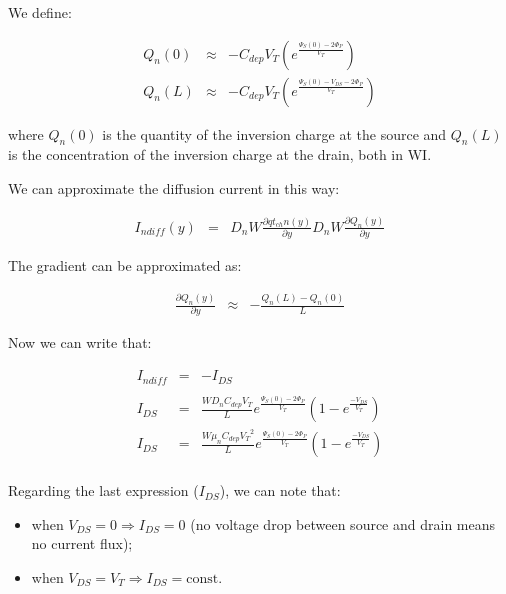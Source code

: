 \documentclass[a4paper, 12pt, twoside, openright]{report}
\begin{document}
We define:

	\begin{eqnarray*}
	Q_n(0)&\approx&-C_{dep} V_T
	             \left(e^{\displaystyle \frac{\Psi_S(0)-2\Phi_P}{V_T}}
	               \right)\\[2ex]
	Q_n(L)&\approx&-C_{dep} V_T
	             \left(e^{\displaystyle \frac{\Psi_S(0)- {V_{DS}}-2\Phi_P}{V_T}}
	              \right)
	\end{eqnarray*}

where $Q_{n}(0)$ is the quantity of the inversion charge at the source and $Q_{n}(L)$ is the concentration of the inversion charge at the drain, both in WI.

We can approximate the diffusion current in this way:

	 \begin{eqnarray*}
	  I_{ndiff}(y) &=& D_nW \frac{\partial  {qt_{ch} n(y)}}{\partial y} D_nW \frac{\partial Q_n(y)}{\partial y}
	 \end{eqnarray*}

The gradient can be approximated as:

	 \begin{eqnarray*}
	  \frac{\partial Q_n(y)}{\partial y} &\approx& - \frac{Q_n(L)-Q_n(0)}{L}
	 \end{eqnarray*}

Now we can write that:

	 \begin{eqnarray*}
	  I_{ndiff} &=& -I_{DS}\\[2ex]\\
	  I_{DS}    &=& \frac{W D_n C_{dep} V_T}{L}  
	            e^{\displaystyle \frac{ {\Psi_S(0)-2\Phi_P}}{V_T}}
	           \left( 1-e^{\displaystyle\frac{-V_{DS}}{V_T}}\right)\\[2ex]
	  I_{DS}    &=& \frac{W \mu_n C_{dep} {V_T}^2}{L}  
	            e^{\displaystyle \frac{ {\Psi_S(0)-2\Phi_P}}{V_T}}
	           \left( 1-e^{\displaystyle\frac{-V_{DS}}{V_T}}\right)\\[2ex]
	  \end{eqnarray*}

Regarding the last expression ($I_{DS}$), we can note that:

\begin{itemize}
\item when $V_{DS} = 0 \Rightarrow I_{DS} = 0$ (no voltage drop between source and drain means no current flux);
\item when $V_{DS} = V_T \Rightarrow I_{DS} = \text{const.}$
\end{itemize}
\end{document}
